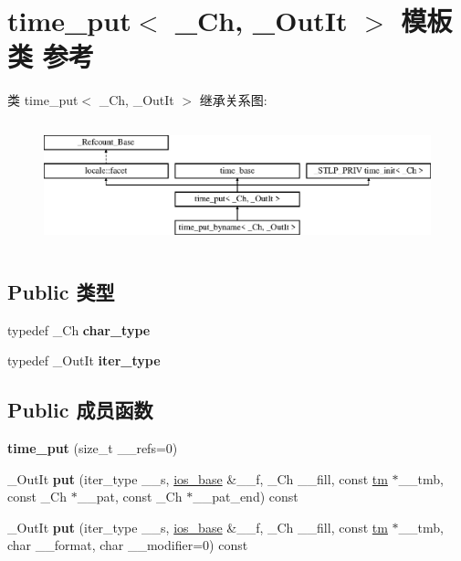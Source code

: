 \hypertarget{classtime__put}{}\section{time\+\_\+put$<$ \+\_\+\+Ch, \+\_\+\+Out\+It $>$ 模板类 参考}
\label{classtime__put}
类 time\+\_\+put$<$ \+\_\+\+Ch, \+\_\+\+Out\+It $>$ 继承关系图\+:\begin{figure}[H]
\begin{center}
\leavevmode
\includegraphics[height=3.624595cm]{classtime__put}
\end{center}
\end{figure}
\subsection*{Public 类型}
\begin{DoxyCompactItemize}
\item 
\mbox{\label{classtime__put_ab2d507b3aa37d022d07751907f72b4d5}} 
typedef \+\_\+\+Ch {\bfseries char\+\_\+type}
\item 
\mbox{\label{classtime__put_a88b97f1e55c746c4d5397e1029c15f28}} 
typedef \+\_\+\+Out\+It {\bfseries iter\+\_\+type}
\end{DoxyCompactItemize}
\subsection*{Public 成员函数}
\begin{DoxyCompactItemize}
\item 
\mbox{\label{classtime__put_a3b6ad4ab310749066bc026f7a4d5330f}} 
{\bfseries time\+\_\+put} (size\+\_\+t \+\_\+\+\_\+refs=0)
\item 
\mbox{\label{classtime__put_a3dad046b4249fb8b2a8a33b194f919fd}} 
\+\_\+\+Out\+It {\bfseries put} (iter\+\_\+type \+\_\+\+\_\+s, \hyperlink{classios__base}{ios\+\_\+base} \&\+\_\+\+\_\+f, \+\_\+\+Ch \+\_\+\+\_\+fill, const \hyperlink{structtm}{tm} $\ast$\+\_\+\+\_\+tmb, const \+\_\+\+Ch $\ast$\+\_\+\+\_\+pat, const \+\_\+\+Ch $\ast$\+\_\+\+\_\+pat\+\_\+end) const
\item 
\mbox{\label{classtime__put_a6e8b7beca86bdeea3f2bb65d922f6adc}} 
\+\_\+\+Out\+It {\bfseries put} (iter\+\_\+type \+\_\+\+\_\+s, \hyperlink{classios__base}{ios\+\_\+base} \&\+\_\+\+\_\+f, \+\_\+\+Ch \+\_\+\+\_\+fill, const \hyperlink{structtm}{tm} $\ast$\+\_\+\+\_\+tmb, char \+\_\+\+\_\+format, char \+\_\+\+\_\+modifier=0) const
\end{DoxyCompactItemize}
